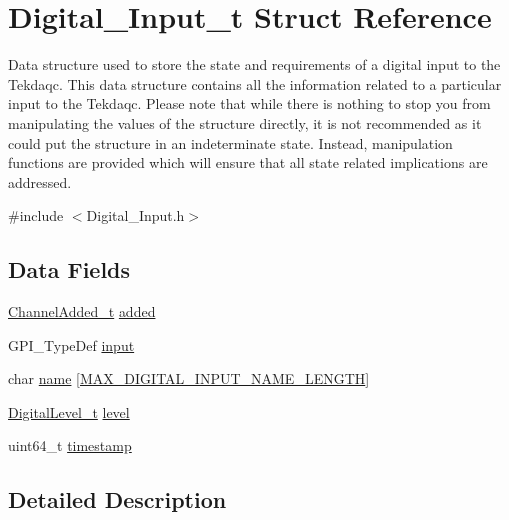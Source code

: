 \hypertarget{struct_digital___input__t}{\section{Digital\-\_\-\-Input\-\_\-t Struct Reference}
\label{struct_digital___input__t}
}


Data structure used to store the state and requirements of a digital input to the Tekdaqc. This data structure contains all the information related to a particular input to the Tekdaqc. Please note that while there is nothing to stop you from manipulating the values of the structure directly, it is not recommended as it could put the structure in an indeterminate state. Instead, manipulation functions are provided which will ensure that all state related implications are addressed.  




{\ttfamily \#include $<$Digital\-\_\-\-Input.\-h$>$}

\subsection*{Data Fields}
\begin{DoxyCompactItemize}
\item 
\hyperlink{group__board__channel__constants_gab0f30599ceb99e5ba3b2908d8e9bd131}{Channel\-Added\-\_\-t} \hyperlink{struct_digital___input__t_a6f1a4402ff8651dfc5e453b5e3154c2d}{added}
\item 
G\-P\-I\-\_\-\-Type\-Def \hyperlink{struct_digital___input__t_abc35a555f8e6b8717b5232ee5220726f}{input}
\item 
char \hyperlink{struct_digital___input__t_af41190915b6eafe6003d377631e93f5a}{name} \mbox{[}\hyperlink{group__digital__input_gaf48b39ba82663f6926d1a02d1e501926}{M\-A\-X\-\_\-\-D\-I\-G\-I\-T\-A\-L\-\_\-\-I\-N\-P\-U\-T\-\_\-\-N\-A\-M\-E\-\_\-\-L\-E\-N\-G\-T\-H}\mbox{]}
\item 
\hyperlink{group__board__channel__constants_gaee574a0d48c41a3e5426ffbf8ac4c5c4}{Digital\-Level\-\_\-t} \hyperlink{struct_digital___input__t_a077d2fbd9f466d58856071f5314b9c09}{level}
\item 
uint64\-\_\-t \hyperlink{struct_digital___input__t_a465bef81f6478756e5443025b1f2ddfa}{timestamp}
\end{DoxyCompactItemize}


\subsection{Detailed Description}


